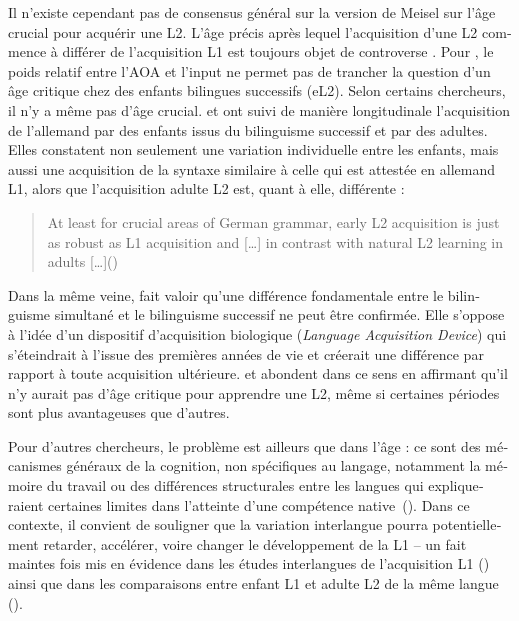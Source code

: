 \documentclass[french, output=paper]{langscibook}
\begin{document}
\begin{otherlanguage}{french}
Il n’existe cependant pas de consensus général sur la version de Meisel sur l’âge crucial pour acquérir une L2. L’âge précis après lequel l’acquisition d’une L2 commence à différer de l’acquisition L1 est toujours objet de controverse \citep{Dimroth2009}. Pour \citet{Unsworth2016}, le poids relatif entre l’AOA et l’input ne permet pas de trancher la question d’un âge critique chez des enfants bilingues successifs (eL2). Selon certains chercheurs, il n’y a même pas d’âge crucial. \citet{RothweilerKroffke2006} et \citet{TracyThoma2009} ont suivi de manière longitudinale l’acquisition de l’allemand par des enfants issus du bilinguisme successif et par des adultes. Elles constatent non seulement une variation individuelle entre les enfants, mais aussi une acquisition de la syntaxe similaire à celle qui est attestée en allemand L1, alors que l’acquisition adulte L2 est, quant à elle, différente : 


\begin{quote}
At least for crucial areas of German grammar, early L2 acquisition is just as robust as L1 acquisition and […] in contrast with natural L2 learning in adults […]\hbox{}\hfill\hbox{(\citealt[12]{TracyThoma2009})}
\end{quote}

Dans la même veine, \citet{Montrul2008} fait valoir qu’une différence fondamentale entre le bilinguisme simultané et le bilinguisme successif ne peut être confirmée. Elle s’oppose à l’idée d’un dispositif d’acquisition biologique (\textit{Language Acquisition Device}) qui s’éteindrait à l’issue des premières années de vie et créerait une différence par rapport à toute acquisition ultérieure. \citet{BirdsongVanhove2016} et \citet{Singleton2003} abondent dans ce sens en affirmant qu’il n’y aurait pas d'âge critique pour apprendre une L2, même si certaines périodes sont plus avantageuses que d’autres.


Pour d’autres chercheurs, le problème est ailleurs que dans l’âge : ce sont des mécanismes généraux de la cognition, non spécifiques au langage, notamment la mémoire du travail ou des différences structurales entre les langues qui expliqueraient certaines limites dans l’atteinte d’une compétence native~(\citealt[70]{Kail2015}). Dans ce contexte, il convient de souligner que la variation interlangue pourra potentiellement retarder, accélérer, voire changer le développement de la L1 -- un fait maintes fois mis en évidence dans les études interlangues de l’acquisition L1 (\citealt{BermanSlobin1994, Slobin1996, Hickmann2003}) ainsi que dans les comparaisons entre enfant L1 et adulte L2 de la même langue (\citealt{Berman1987, Slobin2012, Watorek2017}). 



\end{otherlanguage}
\end{document}
